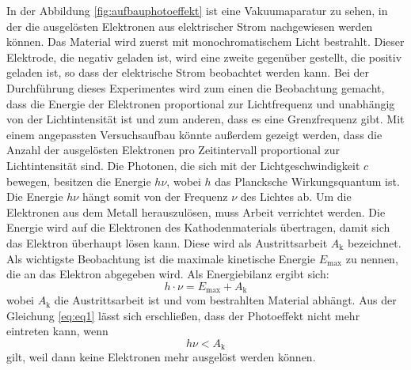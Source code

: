 In der Abbildung \ref{fig:aufbauphotoeffekt} ist eine Vakuumaparatur zu sehen, in der die ausgelösten Elektronen aus elektrischer Strom nachgewiesen werden können. Das Material wird zuerst mit monochromatischem Licht bestrahlt. Dieser Elektrode, 
die negativ geladen ist, wird eine zweite gegenüber gestellt, die positiv geladen ist, so dass der elektrische Strom beobachtet werden kann. 
Bei der Durchführung dieses Experimentes wird zum einen die Beobachtung gemacht, dass die Energie der Elektronen proportional zur Lichtfrequenz und unabhängig von der Lichtintensität ist und zum anderen, dass es eine Grenzfrequenz gibt. 
Mit einem angepassten Versuchsaufbau könnte außerdem gezeigt werden, dass die Anzahl der ausgelösten Elektronen pro Zeitintervall proportional zur Lichtintensität sind.
Die Photonen, die sich mit der Lichtgeschwindigkeit $c$ bewegen, besitzen die Energie $h\nu$, wobei $h$ das Plancksche Wirkungsquantum ist. Die Energie $h\nu$ hängt somit von der Frequenz $\nu$ des Lichtes ab.
Um die Elektronen aus dem Metall herauszulösen, muss Arbeit verrichtet werden. Die Energie wird auf die Elektronen des Kathodenmaterials übertragen, damit sich das Elektron überhaupt lösen kann. Diese wird als Austrittsarbeit $A_\text{k}$ bezeichnet. 
Als wichtigste Beobachtung ist die maximale kinetische Energie $E_\text{max}$ zu nennen, die an das Elektron abgegeben wird. 
Als Energiebilanz ergibt sich:
\begin{equation}
\label{eq:eq1}
h \cdot \nu = E_\text{max} + A_\text{k}
\end{equation}
wobei $A_\text{k}$ die Austrittsarbeit ist und vom bestrahlten Material abhängt.
Aus der Gleichung \ref{eq:eq1} lässt sich erschließen, dass der Photoeffekt nicht mehr eintreten kann, wenn
\begin{equation*}
h \nu < A_\text{k}
\end{equation*}
gilt, weil dann keine Elektronen mehr ausgelöst werden können. 


